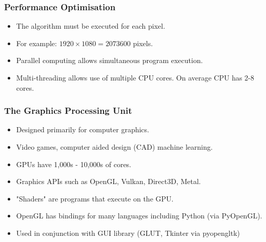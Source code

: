 \documentclass{beamer}
\begin{document}
\begin{frame}
\frametitle{Performance Optimisation}
\begin{itemize}
\item The algorithm must be executed for each pixel.
\item For example: $1920 \times 1080 = 2073600$ pixels.
\item Parallel computing allows simultaneous program execution.
\item Multi-threading allows use of multiple CPU cores. On average CPU has 2-8 cores.
\end{itemize}
\end{frame}


\begin{frame}
\frametitle{The Graphics Processing Unit}
\begin{itemize}
\item Designed primarily for computer graphics.
\item Video games, computer aided design (CAD) machine learning.
\item GPUs have 1,000s - 10,000s of cores.
\item Graphics APIs such as OpenGL, Vulkan, Direct3D, Metal.
\item "Shaders" are programs that execute on the GPU.
\item OpenGL has bindings for many languages including Python (via PyOpenGL).
\item Used in conjunction with GUI library (GLUT, Tkinter via pyopengltk)
\end{itemize}
\end{frame}
\end{document}
